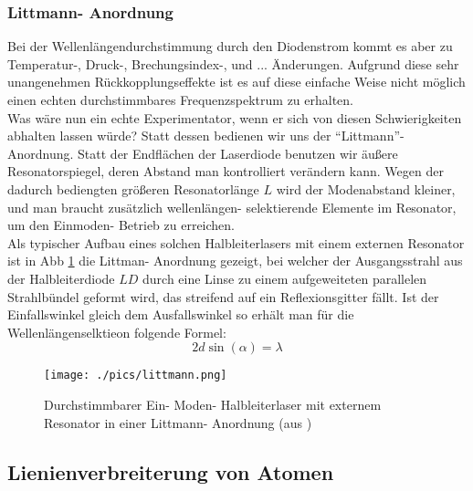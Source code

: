 \documentclass[a4paper,oneside]{article}
\begin{document}
\subsubsection{Littmann- Anordnung}
Bei der Wellenlängendurchstimmung durch den Diodenstrom kommt es aber zu Temperatur-, Druck-, Brechungsindex-, und ... Änderungen. Aufgrund diese sehr unangenehmen Rückkopplungseffekte ist es auf diese einfache Weise nicht möglich einen echten durchstimmbares Frequenzspektrum zu erhalten.\\
Was wäre nun ein echte Experimentator, wenn er sich von diesen Schwierigkeiten abhalten lassen würde? Statt dessen bedienen wir uns der ``Littmann''-Anordnung. Statt der Endflächen der Laserdiode benutzen wir äußere Resonatorspiegel, deren Abstand man kontrolliert verändern kann. Wegen der dadurch bediengten größeren Resonatorlänge $L$ wird der Modenabstand kleiner, und man braucht zusätzlich wellenlängen- selektierende Elemente im Resonator, um den Einmoden- Betrieb zu erreichen.\\
Als typischer Aufbau eines solchen Halbleiterlasers mit einem externen Resonator ist in Abb \ref{littmann} die Littman- Anordnung gezeigt, bei welcher der Ausgangsstrahl aus der Halbleiterdiode $LD$ durch eine Linse zu einem aufgeweiteten parallelen Strahlbündel geformt wird, das streifend auf ein Reflexionsgitter fällt. Ist der Einfallswinkel gleich dem Ausfallswinkel so erhält man für die Wellenlängenselktieon folgende Formel:
\begin{equation}
 2d\sin(\alpha)=\lambda
\end{equation}
\begin{figure}[!htb]
 \centering
 \texttt{[image: ./pics/littmann.png]}
 \caption[Littman- Anordung(aus \cite{deml})]{Durchstimmbarer Ein- Moden- Halbleiterlaser mit externem Resonator in einer Littmann- Anordnung (aus \cite{deml})}
 \label{littmann}
\end{figure}

\subsection{Lienienverbreiterung von Atomen}
\end{document}
